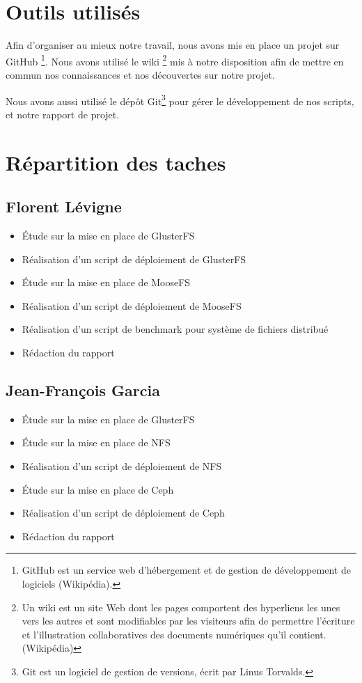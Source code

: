 \documentclass[12pt]{report}
\begin{document}
			\section{Outils utilisés}
				Afin d'organiser au mieux notre travail, nous avons mis en place un projet sur GitHub
				\footnote{GitHub est un service web d'hébergement et de gestion de développement de logiciels (Wikipédia).}.
				Nous avons utilisé le wiki
				\footnote{Un wiki est un site Web dont les pages comportent des hyperliens les unes vers les autres
				et sont modifiables par les visiteurs afin de permettre l'écriture et l'illustration collaboratives des documents numériques qu'il contient. (Wikipédia)}
				mis à notre disposition afin de mettre en commun nos connaissances et nos découvertes sur notre projet.

				Nous avons aussi utilisé le dépôt Git\footnote{Git est un logiciel de gestion de versions, écrit par Linus Torvalds.} pour gérer le développement de nos scripts, et notre rapport de projet.
\newpage
			\section{Répartition des taches}
				\subsection{Florent Lévigne}
					\begin{itemize}
						\item Étude sur la mise en place de GlusterFS
						\item Réalisation d'un script de déploiement de GlusterFS
						\item Étude sur la mise en place de MooseFS
						\item Réalisation d'un script de déploiement de MooseFS
						\item Réalisation d'un script de benchmark pour système de fichiers distribué
						\item Rédaction du rapport
					\end{itemize}
				\subsection{Jean-François Garcia}
					\begin{itemize}
						\item Étude sur la mise en place de GlusterFS
						\item Étude sur la mise en place de NFS
						\item Réalisation d'un script de déploiement de NFS
						\item Étude sur la mise en place de Ceph
						\item Réalisation d'un script de déploiement de Ceph
						\item Rédaction du rapport
					\end{itemize}
\end{document}
